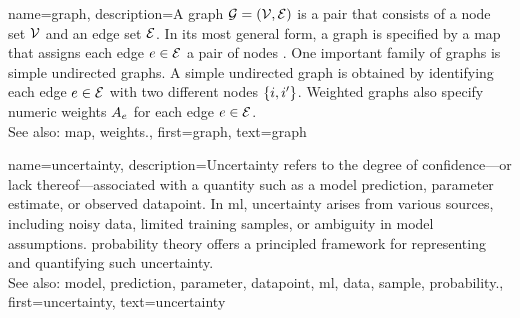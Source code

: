 {name={graph},
	description={A graph $\mathcal{G} = \left( \mathcal{V},\mathcal{E} \right)$ is a pair that consists of 
		a node set $\mathcal{V}$ and an edge set $\mathcal{E}$. In its most general form, a graph is 
		specified by a \gls{map} that assigns each edge $e \in \mathcal{E}$ a pair of nodes \cite{RockNetworks}. 
		One important family of graphs is simple undirected graphs. A simple undirected graph 
		is obtained by identifying each edge $e \in \mathcal{E}$ with two different nodes $\{i,i'\}$. 
		Weighted graphs also specify numeric \gls{weights} $A_{e}$ for each 
		edge $e \in \mathcal{E}$.
					\\ 
		See also: \gls{map}, \gls{weights}.},
	first={graph},
	text={graph} 
}

{name={uncertainty},
	description={Uncertainty refers to the degree of confidence—or 
		lack thereof—associated with a quantity such as a \gls{model} \gls{prediction}, \gls{parameter} estimate, or 
		observed \gls{datapoint}. In \gls{ml}, uncertainty arises from various sources, including 
		noisy \gls{data}, limited training \glspl{sample}, or ambiguity in \gls{model} assumptions. \Gls{probability} theory 
		offers a principled framework for representing and quantifying such uncertainty.
					\\ 
		See also: \gls{model}, \gls{prediction}, \gls{parameter}, \gls{datapoint}, \gls{ml}, \gls{data}, \gls{sample}, \gls{probability}.},
	first={uncertainty},
	text={uncertainty}
}

